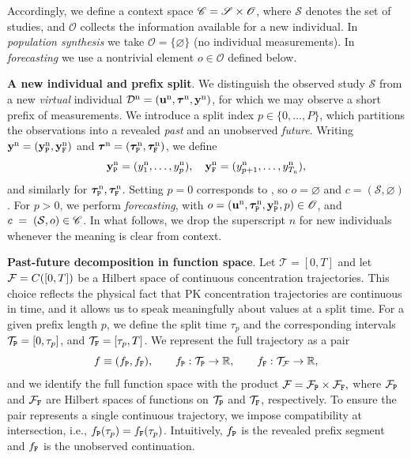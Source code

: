 Accordingly, we define a context space $\mathscr{C} = \mathscr{S} \times \mathscr{O}$, 
%
where $\mathscr{S}$ denotes the set of studies, and $\mathscr{O}$ collects the information available for a new individual. 
%
In \textit{population synthesis} we take $\mathscr{O}=\{\varnothing\}$ (no individual measurements). 
%
In \textit{forecasting} we use a nontrivial element $o\in\mathscr{O}$ defined below.

\textbf{A new individual and prefix split}.
%
We distinguish the observed study $\mathcal S$ from a new \textit{virtual} individual $\mathcal D^{\rm n} = (\mathbf u^{\rm n},\boldsymbol{\tau}^{\rm n},\mathbf y^{\rm n})$,
%
for which we may observe a short prefix of measurements. 
%
We introduce a split index $p \in \{0,\dots,P\}$,
%
which partitions the observations into a revealed \textit{past} and an unobserved \textit{future}. Writing $\mathbf{y}^{\rm n}=(\mathbf y^{\rm n}_{\tt P},\mathbf y^{\rm n}_{\tt F})$ and $\boldsymbol{\tau}^{\rm n}=(\boldsymbol{\tau}^{\rm n}_{\tt P},\boldsymbol{\tau}^{\rm n}_{\tt F})$,
%
we define
\[
\mathbf y^{\rm n}_{\tt P}=(y_1^{\rm {\rm n}},\dots,y_p^{\rm n}),\quad
\mathbf y^{\rm n}_{\tt F}=(y_{p+1}^{\rm {\rm n}},\dots,y_{T_{\rm n}}^{\rm n}),
\]
and similarly for $\boldsymbol{\tau}^{\rm n}_{\tt P},\boldsymbol{\tau}^{\rm n}_{\tt F}$.  Setting $p=0$ corresponds to , so $o=\varnothing$ and $c=(\mathcal S,\varnothing)$. For $p>0$, we perform \textit{forecasting}, with $o = (\mathbf u^{\rm n},\boldsymbol{\tau}^{\rm n}_{\tt P},\mathbf y^{\rm n}_{\tt P},p) \in \mathscr{O}$, and $c \;=\; (\mathcal S,o)\in\mathscr{C}$. In what follows, we drop the superscript $n$ for new individuals whenever the meaning is clear from context.

\textbf{Past-future decomposition in function space}.
%
Let $\mathcal T=[0,T]$ and let $\mathcal{F}= C([0,T])$ be a Hilbert space of continuous concentration trajectories.
%
This choice reflects the physical fact that PK concentration trajectories are continuous in time, and it allows us to speak meaningfully about values at a split time.
%
For a given prefix length $p$, we define the split time $\tau_p$ and the corresponding intervals $\mathcal T_{\tt P}=[0,\tau_p]$, and $\mathcal T_{\tt F}=[\tau_p,T]$.
%
We represent the full trajectory as a pair
\[
f \equiv (f_{\tt P},f_{\tt F}),
\qquad
f_{\tt P}:\mathcal T_{\tt P}\to\mathbb R,
\qquad
f_{\tt F}:\mathcal T_{\mathcal{F}}\to\mathbb R,
\]
and we identify the full function space with the product $\mathcal{F} = \mathcal{F}_{\tt P}\times\mathcal{F}_{\tt F},$
%
where $\mathcal{F}_{\tt P}$ and $\mathcal{F}_{\tt F}$ are Hilbert spaces of functions on $\mathcal T_{\tt P}$ and $\mathcal T_{\tt F}$, respectively. 
%
To ensure the pair represents a single continuous trajectory, we impose compatibility at intersection, i.e., $f_{\tt P}(\tau_p) = f_{\tt F}(\tau_p)$.
%
Intuitively, $f_{\tt P}$ is the revealed prefix segment and $f_{\tt F}$ is the unobserved continuation.

